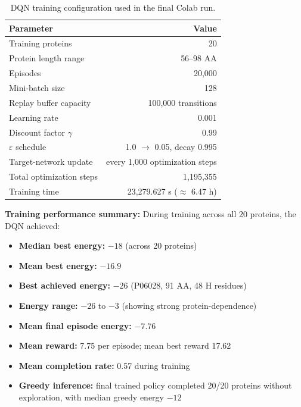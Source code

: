 \begin{table}[!htbp]
\centering
\caption[DQN training configuration]{DQN training configuration used in the final Colab run.}
\label{tab:dqn_training_configuration}
\small
\begin{tabular}{lr}
\hline
\textbf{Parameter} & \textbf{Value} \\
\hline
Training proteins & 20 \\
Protein length range & 56--98 AA \\
Episodes & 20,000 \\
Mini-batch size & 128 \\
Replay buffer capacity & 100,000 transitions \\
Learning rate & 0.001 \\
Discount factor $\gamma$ & 0.99 \\
$\varepsilon$ schedule & 1.0 $\rightarrow$ 0.05, decay 0.995 \\
Target-network update & every 1,000 optimization steps \\
Total optimization steps & 1,195,355 \\
Training time & 23,279.627 s ($\approx$ 6.47 h) \\
\hline
\end{tabular}
\end{table}
\FloatBarrier

\textbf{Training performance summary:} During training across all 20 proteins, the DQN achieved:
\begin{itemize}
    \item \textbf{Median best energy:} $-18$ (across 20 proteins)
    \item \textbf{Mean best energy:} $-16.9$
    \item \textbf{Best achieved energy:} $-26$ (P06028, 91 AA, 48 H residues)
    \item \textbf{Energy range:} $-26$ to $-3$ (showing strong protein-dependence)
    \item \textbf{Mean final episode energy:} $-7.76$
    \item \textbf{Mean reward:} 7.75 per episode; mean best reward 17.62
    \item \textbf{Mean completion rate:} 0.57 during training
    \item \textbf{Greedy inference:} final trained policy completed 20/20 proteins without exploration, with median greedy energy $-12$
\end{itemize}

